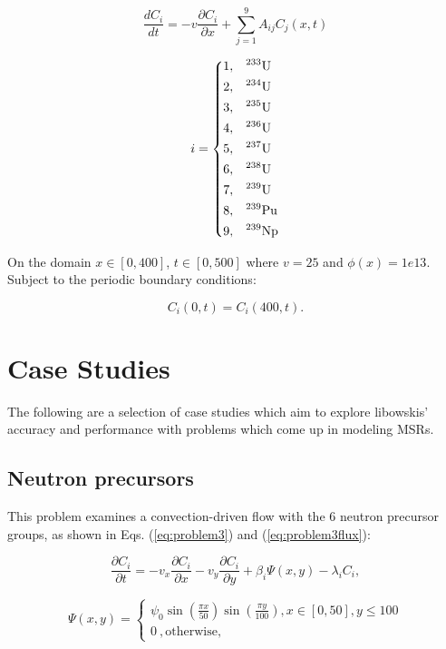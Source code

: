 \begin{equation}
\frac{d C_i}{dt} = -v\frac{\partial C_{i}}{\partial x} + \sum^9_{j = 1} A_{ij} C_j (x, t)
\end{equation}

\begin{equation}
i = \begin{dcases}
  1 , & \text{$^{233}$U}  \\
  2 , & \text{$^{234}$U}  \\
  3 , & \text{$^{235}$U}  \\
  4 , & \text{$^{236}$U}  \\
  5 , & \text{$^{237}$U}  \\
  6 , & \text{$^{238}$U}  \\
  7 , & \text{$^{239}$U}  \\
  8 , & \text{$^{239}$Pu} \\
  9 , & \text{$^{239}$Np} \\
\end{dcases}
\end{equation}

\noindent On the domain $x \in [0, 400]$, $t \in [0, 500]$ where $v = 25$ and $\phi(x) = 1e13$. Subject to the periodic boundary conditions:

\begin{equation}
    C_{i}(0,t) = C_{i}(400,t).
\end{equation}

\section{Case Studies}
The following are a selection of case studies which aim to explore libowskis' accuracy and performance with problems which come up in modeling MSRs. 

\subsection{Neutron precursors}
This problem examines a convection-driven flow with the 6 neutron precursor groups, as shown in Eqs. (\ref{eq:problem3}) and (\ref{eq:problem3flux}): 

\begin{equation}
\frac{\partial C_{i}}{\partial t} = -v_{x}\frac{\partial C_{i}}{\partial x} - v_{y}\frac{\partial C_{i}}{\partial y} + \beta_{i} \Psi (x, y) -\lambda_i C_{i},
\label{eq:problem3}
\end{equation}

\begin{equation}
\Psi (x, y) = \begin{cases}
  \psi _0 \sin\left(\frac{\pi x}{50}\right)\sin\left(\frac{\pi y}{100}\right) , x \in [0,50], y \le 100 \\
  0\ , \text{otherwise},
  \label{eq:problem3flux}
\end{cases}
\end{equation}

